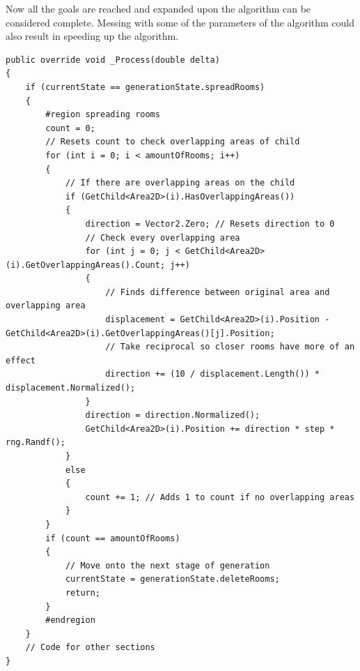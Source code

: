 \documentclass{article}
\newcommand{\parBr}{\vspace{5mm}}%
\begin{document}
\parBr

Now all the goals are reached and expanded upon the algorithm can be considered complete. Messing with some of the parameters of the algorithm could also result in speeding up the algorithm.
\begin{lstlisting}
public override void _Process(double delta)
{
    if (currentState == generationState.spreadRooms)
    {
        #region spreading rooms
        count = 0; 
        // Resets count to check overlapping areas of child
        for (int i = 0; i < amountOfRooms; i++)
        {
            // If there are overlapping areas on the child
            if (GetChild<Area2D>(i).HasOverlappingAreas()) 
            {
                direction = Vector2.Zero; // Resets direction to 0
                // Check every overlapping area
                for (int j = 0; j < GetChild<Area2D>(i).GetOverlappingAreas().Count; j++) 
                {
                    // Finds difference between original area and overlapping area
                    displacement = GetChild<Area2D>(i).Position - GetChild<Area2D>(i).GetOverlappingAreas()[j].Position;
                    // Take reciprocal so closer rooms have more of an effect
                    direction += (10 / displacement.Length()) * displacement.Normalized(); 
                }
                direction = direction.Normalized();
                GetChild<Area2D>(i).Position += direction * step * rng.Randf();
            }
            else
            {
                count += 1; // Adds 1 to count if no overlapping areas
            }
        }
        if (count == amountOfRooms)
        {
            // Move onto the next stage of generation
            currentState = generationState.deleteRooms;
            return;
        }
        #endregion
    }
    // Code for other sections
}

\end{lstlisting}
\end{document}
